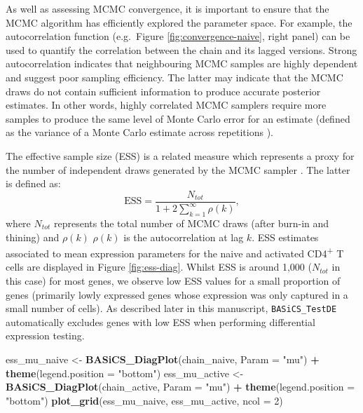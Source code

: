 \documentclass[9pt,a4paper,]{extarticle}
\newenvironment{Shaded}{\begin{snugshade}}{\end{snugshade}}
\newcommand{\DataTypeTok}[1]{\textcolor[rgb]{0.13,0.29,0.53}{#1}}
\newcommand{\DecValTok}[1]{\textcolor[rgb]{0.00,0.00,0.81}{#1}}
\newcommand{\KeywordTok}[1]{\textcolor[rgb]{0.13,0.29,0.53}{\textbf{#1}}}
\newcommand{\NormalTok}[1]{#1}
\newcommand{\OperatorTok}[1]{\textcolor[rgb]{0.81,0.36,0.00}{\textbf{#1}}}
\newcommand{\StringTok}[1]{\textcolor[rgb]{0.31,0.60,0.02}{#1}}
\begin{document}
As well as assessing MCMC convergence, it is important to ensure that the MCMC
algorithm has efficiently explored the parameter space.
For example, the autocorrelation function (e.g.~Figure
\ref{fig:convergence-naive}, right panel) can be used to quantify the
correlation between the chain and its lagged versions.
Strong autocorrelation indicates that neighbouring MCMC samples are highly
dependent and suggest poor sampling efficiency.
The latter may indicate that the MCMC draws do not contain
sufficient information to produce accurate posterior estimates.
In other words, highly correlated MCMC samplers require more samples to produce
the same level of Monte Carlo error for an estimate
(defined as the variance of a Monte Carlo estimate across repetitions \citep{Koehler2009}).

The effective sample size (ESS) is a related measure which represents a proxy
for the number of independent draws generated by the MCMC sampler \citep{Gelman2014}.
The latter is defined as:
\[
  \mbox{ESS} = \frac{N_{tot}}{1 + 2\sum_{k=1}^\infty \rho(k)},
\]
where \(N_{tot}\) represents the total number of MCMC draws (after burn-in and
thining) and \(\rho(k)\) \(\rho(k)\) is the autocorrelation at lag \(k\).
ESS estimates associated to mean expression parameters for the naive and
activated CD4\textsuperscript{+} T cells are displayed in Figure \ref{fig:ess-diag}.
Whilst ESS is around 1,000 (\(N_{tot}\) in this case) for most genes, we observe
low ESS values for a small proportion of genes (primarily lowly expressed genes
whose expression was only captured in a small number of cells).
As described later in this manuscript, \texttt{BASiCS\_TestDE} automatically excludes
genes with low ESS when performing differential expression testing.

\begin{Shaded}
\begin{Highlighting}[]
\NormalTok{ess_mu_naive <-}\StringTok{ }\KeywordTok{BASiCS_DiagPlot}\NormalTok{(chain_naive, }\DataTypeTok{Param =} \StringTok{"mu"}\NormalTok{) }\OperatorTok{+}
\StringTok{  }\KeywordTok{theme}\NormalTok{(}\DataTypeTok{legend.position =} \StringTok{"bottom"}\NormalTok{)}
\NormalTok{ess_mu_active <-}\StringTok{ }\KeywordTok{BASiCS_DiagPlot}\NormalTok{(chain_active, }\DataTypeTok{Param =} \StringTok{"mu"}\NormalTok{) }\OperatorTok{+}
\StringTok{  }\KeywordTok{theme}\NormalTok{(}\DataTypeTok{legend.position =} \StringTok{"bottom"}\NormalTok{)}
\KeywordTok{plot_grid}\NormalTok{(ess_mu_naive, ess_mu_active, }\DataTypeTok{ncol =} \DecValTok{2}\NormalTok{)}
\end{Highlighting}
\end{Shaded}
\end{document}
